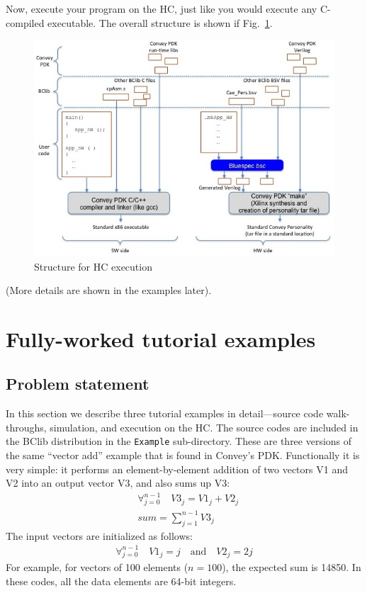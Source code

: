 \documentclass[twoside,letterpaper,11pt]{article}
\begin{document}
Now, execute your program on the HC, just like you would execute any
C-compiled executable.  The overall structure is shown if Fig.~\ref{Fig_HC_exec_structure}.

\begin{figure}[htbp]
  \centerline{\includegraphics[width=6.5in,angle=0]{Figures/Fig_HC_exec_structure}}
  \caption{\label{Fig_HC_exec_structure}Structure for HC execution}
\end{figure}

(More details are shown in the examples later).


\section{Fully-worked tutorial examples}

\label{sec_examples}


\subsection{Problem statement}

In this section we describe three tutorial examples in detail---source
code walk-throughs, simulation, and execution on the HC.  The source
codes are included in the BClib distribution in the \verb|Example|
sub-directory.  These are three versions of the same ``vector add''
example that is found in Convey's PDK.  Functionally it is very
simple: it performs an element-by-element addition of two vectors V1
and V2 into an output vector V3, and also sums up V3:
\begin{align*}
& \forall_{j=0}^{n-1}  \quad  V3_j = V1_j + V2_j \\
& \mathit{sum} = \sum_{j=1}^{n-1} V3_j
\end{align*}
The input vectors are initialized as follows:
\begin{align*}
\forall_{j=0}^{n-1}  \quad  V1_j = j \quad \mathrm{and} \quad V2_j = 2j
\end{align*}
For example, for vectors of 100 elements ($n=100$), the expected sum
is 14850.  In these codes, all the data elements are 64-bit integers.
\end{document}
